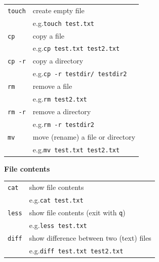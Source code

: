 \documentclass[a4paper]{article}
\begin{document}
\begin{tabular}{@{\hspace{.05\textwidth}}p{}@{}p{}@{}}
		\texttt{touch}	& create empty file	\\
										& \parbox[b]{.1\textwidth}{e.g.}\texttt{touch test.txt}	\\[5pt]
		\texttt{cp}			& copy a file	\\
										& \parbox[b]{.1\textwidth}{e.g.}\texttt{cp test.txt test2.txt}	\\[5pt]
		\texttt{cp -r}	& copy a directory	\\
										& \parbox[b]{.1\textwidth}{e.g.}\texttt{cp -r testdir/ testdir2}	\\[5pt]
		\texttt{rm}			& remove a file	\\
										& \parbox[b]{.1\textwidth}{e.g.}\texttt{rm test2.txt}	\\[5pt]
		\texttt{rm -r}	& remove a directory	\\
										& \parbox[b]{.1\textwidth}{e.g.}\texttt{rm -r testdir2}	\\[5pt]
		\texttt{mv}			& move (rename) a file or directory	\\
										& \parbox[b]{.1\textwidth}{e.g.}\texttt{mv test.txt test2.txt}	\\[5pt]
\end{tabular}
%
\par\textbf{File contents}\\[3pt]
\begin{tabular}{@{\hspace{.05\textwidth}}p{}@{}p{}@{}}
		\texttt{cat}		& show file contents	\\
										& \parbox[b]{.1\textwidth}{e.g.}\texttt{cat test.txt}	\\[5pt]
		\texttt{less}		& show file contents (exit with \texttt{q})	\\
										& \parbox[b]{.1\textwidth}{e.g.}\texttt{less test.txt}	\\[5pt]
		\texttt{diff}		& show difference between two (text) files	\\
										& \parbox[b]{.1\textwidth}{e.g.}\texttt{diff test.txt test2.txt}	\\[5pt]
\end{tabular}
%
\end{document}
